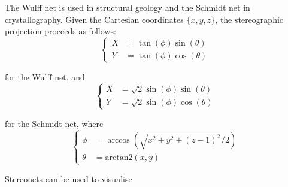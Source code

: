 The Wulff net is used in structural geology and the Schmidt net in
crystallography. Given the Cartesian coordinates $\{x,y,z\}$, the
stereographic projection proceeds as follows:
\begin{equation}
  \left\{
  \begin{split}
    X & = \tan(\phi) \sin(\theta) \\
    Y & = \tan(\phi) \cos(\theta)
  \end{split}
  \right.
\end{equation}

\noindent for the Wulff net, and 
\begin{equation}
  \left\{
  \begin{split}
    X & = \sqrt{2}\sin(\phi)\sin(\theta) \\
    Y & = \sqrt{2}\sin(\phi)\cos(\theta)
  \end{split}
  \right.
\end{equation}

\noindent for the Schmidt net, where
\begin{equation}
  \left\{
  \begin{split}
    \phi & = \arccos\left(\sqrt{{x^2+y^2+(z-1)^2}}/{2}\right) \\
    \theta & = \mbox{arctan2}\left({x},{y}\right)
  \end{split}
  \right.
\end{equation}

Stereonets can be used to visualise

